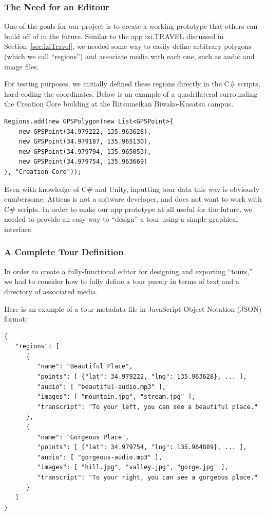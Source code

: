 \documentclass[a4paper, 10pt, american, titlepage]{article}
\begin{document}
\subsubsection{The Need for an Editour}
\label{sec:theNeedForAnEditour}

One of the goals for our project is to create a working prototype that others
can build off of in the future. Similar to the app izi.TRAVEL discussed in
Section~\ref{sec:iziTravel}, we needed some way to easily define arbitrary
polygons (which we call ``regions'') and associate media with each one, such as
audio and image files.

For testing purposes, we initially defined these regions directly in the C\#
scripts, hard-coding the coordinates. Below is an example of a quadrilateral
surrounding the Creation Core building at the Ritsumeikan Biwako-Kusatsu campus.

\begin{verbatim}
Regions.add(new GPSPolygon(new List<GPSPoint>{
    new GPSPoint(34.979222, 135.963628),
    new GPSPoint(34.979187, 135.965130),
    new GPSPoint(34.979794, 135.965053),
    new GPSPoint(34.979754, 135.963669)
}, "Creation Core"));
\end{verbatim}

Even with knowledge of C\# and Unity, inputting tour data this way is obviously
cumbersome. Atticus is not a software developer, and does not want to work with
C\# scripts. In order to make our app prototype at all useful for the future,
we needed to provide an easy way to ``design'' a tour using a simple graphical
interface.

\subsubsection{A Complete Tour Definition}
\label{sec:tourDefinition}

In order to create a fully-functional editor for designing and exporting
``tours,'' we had to consider how to fully define a tour purely in terms
of text and a directory of associated media.

Here is an example of a tour metadata file in JavaScript Object Notation (JSON)
format:

\begin{verbatim}
{
   "regions": [
      {
         "name": "Beautiful Place",
         "points": [ {"lat": 34.979222, "lng": 135.963628}, ... ],
         "audio": [ "beautiful-audio.mp3" ],
         "images": [ "mountain.jpg", "stream.jpg" ],
         "transcript": "To your left, you can see a beautiful place."
      },
      {
         "name": "Gorgeous Place",
         "points": [ {"lat": 34.979754, "lng": 135.964889}, ... ],
         "audio": [ "gorgeous-audio.mp3" ],
         "images": [ "hill.jpg", "valley.jpg", "gorge.jpg" ],
         "transcript": "To your right, you can see a gorgeous place."
      }
   ]
}
\end{verbatim}
\end{document}

